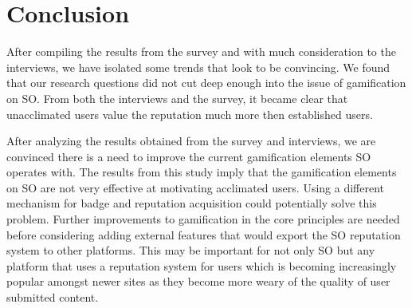 \documentclass{sigchi}
\begin{document}
\section{Conclusion}

After compiling the results from the survey and with much consideration to the interviews, we have isolated some trends that look to be convincing. We found that our research questions did not cut deep enough into the issue of gamification on SO. From both the interviews and the survey, it became clear that unacclimated users value the reputation much more then established users.

After analyzing the results obtained from the survey and interviews, we are convinced there is a need to improve the current gamification elements SO operates with. The results from this study imply that the gamification elements on SO are not very effective at motivating acclimated users. Using a different mechanism for badge and reputation acquisition could potentially solve this problem. Further improvements to gamification in the core principles are needed before considering adding external features that would export the SO reputation system to other platforms. This may be important for not only SO but any platform that uses a reputation system for users which is becoming increasingly popular amongst newer sites as they become more weary of the quality of user submitted content.


\nocite{*}  %


\end{document}
